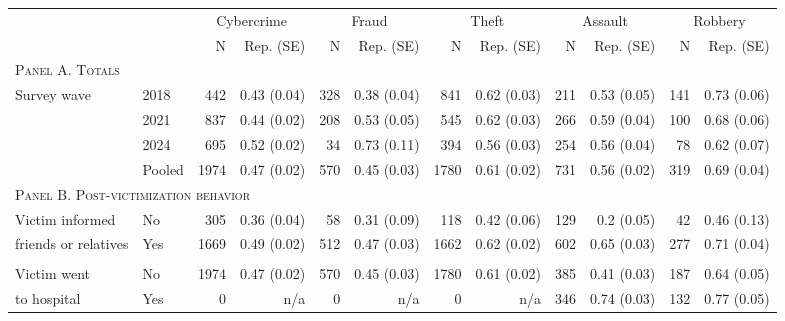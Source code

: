 \begin{tabular}{p{1.3in}p{1.1in}rrrrrrrrrr}
	\toprule
	&  & \multicolumn{2}{c}{Cybercrime    } & \multicolumn{2}{c}{Fraud    } & \multicolumn{2}{c}{Theft    } & \multicolumn{2}{c}{Assault    } & \multicolumn{2}{c}{Robbery} \\ 
	\cmidrule(lr){3-4} \cmidrule(lr){5-6} \cmidrule(lr){7-8} \cmidrule(lr){9-10} \cmidrule(lr){11-12}
	&     & N & Rep. (SE) & N  & Rep. (SE)  & N   & Rep. (SE)   & N    & Rep. (SE)    & N     & Rep. (SE)     \\ 
	\multicolumn{12}{l}{\textsc{Panel A. Totals}} \\
Survey wave & 2018 & 442 & 0.43 (0.04) & 328 & 0.38 (0.04) & 841 & 0.62 (0.03) & 211 & 0.53 (0.05) & 141 & 0.73 (0.06) \\ 
& 2021 & 837 & 0.44 (0.02) & 208 & 0.53 (0.05) & 545 & 0.62 (0.03) & 266 & 0.59 (0.04) & 100 & 0.68 (0.06) \\ 
& 2024 & 695 & 0.52 (0.02) & 34 & 0.73 (0.11) & 394 & 0.56 (0.03) & 254 & 0.56 (0.04) & 78 & 0.62 (0.07) \\ 
 & Pooled & 1974 & 0.47 (0.02) & 570 & 0.45 (0.03) & 1780 & 0.61 (0.02) & 731 & 0.56 (0.02) & 319 & 0.69 (0.04) \\ 
 \midrule
	\multicolumn{12}{l}{\textsc{Panel B. Post-victimization behavior}} \\
	Victim informed %
& No & 305 & 0.36 (0.04) & 58 & 0.31 (0.09) & 118 & 0.42 (0.06) & 129 & 0.2 (0.05) & 42 & 0.46 (0.13) \\ 
friends or relatives  & Yes & 1669 & 0.49 (0.02) & 512 & 0.47 (0.03) & 1662 & 0.62 (0.02) & 602 & 0.65 (0.03) & 277 & 0.71 (0.04) \\ 
\vspace{1pt}\\
Victim went & No & 1974 & 0.47 (0.02) & 570 & 0.45 (0.03) & 1780 & 0.61 (0.02) & 385 & 0.41 (0.03) & 187 & 0.64 (0.05) \\ 
to hospital & Yes & 0 & n/a & 0 & n/a & 0 & n/a & 346 & 0.74 (0.03) & 132 & 0.77 (0.05) \\ 


\end{tabular}
